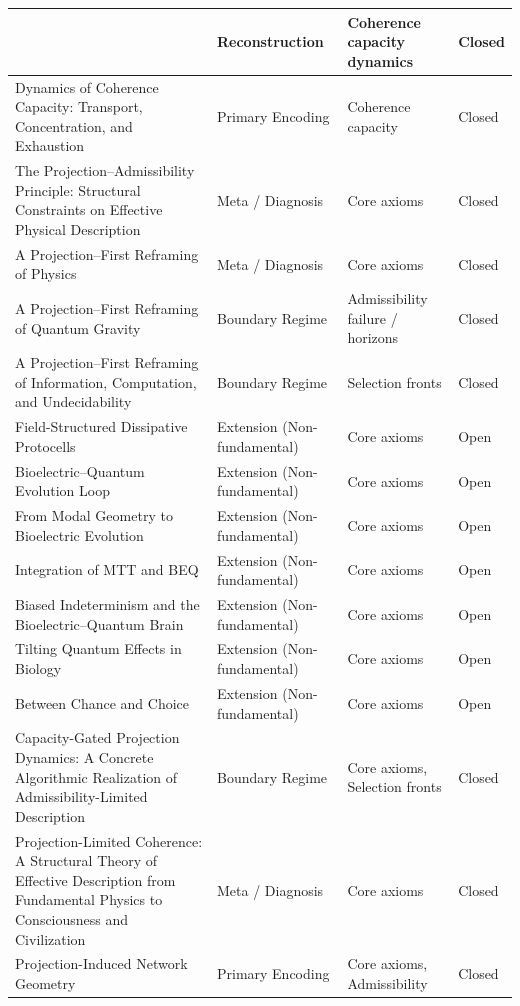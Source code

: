 \documentclass[11pt]{article}
\begin{document}
\begin{center}
\begin{tabular}{|p{7.2cm}|p{3.6cm}|p{3.6cm}|p{1.6cm}|}
& Reconstruction & Coherence capacity dynamics & Closed \\
\hline
Dynamics of Coherence Capacity: Transport, Concentration, and Exhaustion
& Primary Encoding & Coherence capacity & Closed \\
\hline
The Projection--Admissibility Principle: Structural Constraints on Effective Physical Description
& Meta / Diagnosis & Core axioms & Closed \\
\hline
A Projection--First Reframing of Physics
& Meta / Diagnosis & Core axioms & Closed \\
\hline
A Projection--First Reframing of Quantum Gravity
& Boundary Regime & Admissibility failure / horizons & Closed \\
\hline
A Projection--First Reframing of Information, Computation, and Undecidability
& Boundary Regime & Selection fronts & Closed \\
\hline
Field-Structured Dissipative Protocells
& Extension (Non-fundamental) & Core axioms & Open\\
\hline
Bioelectric--Quantum Evolution Loop
& Extension (Non-fundamental) & Core axioms & Open\\
\hline
From Modal Geometry to Bioelectric Evolution
& Extension (Non-fundamental) & Core axioms & Open\\
\hline
Integration of MTT and BEQ
& Extension (Non-fundamental) & Core axioms & Open\\
\hline
Biased Indeterminism and the Bioelectric--Quantum Brain
& Extension (Non-fundamental) & Core axioms & Open\\
\hline
Tilting Quantum Effects in Biology
& Extension (Non-fundamental) & Core axioms & Open\\
\hline
Between Chance and Choice
& Extension (Non-fundamental) & Core axioms & Open\\
\hline
Capacity-Gated Projection Dynamics: A Concrete Algorithmic Realization
of Admissibility-Limited Description
& Boundary Regime
& Core axioms, Selection fronts
& Closed \\
\hline
Projection-Limited Coherence: A Structural Theory of Effective Description
from Fundamental Physics to Consciousness and Civilization
& Meta / Diagnosis
& Core axioms
& Closed \\
\hline
Projection-Induced Network Geometry
& Primary Encoding
& Core axioms, Admissibility
& Closed \\
\hline
\end{tabular}
\end{center}

\bigskip
\nocite{*}

\end{document}
